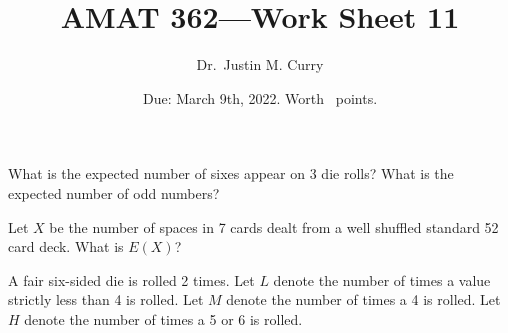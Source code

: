 \documentclass[addpoints,12pt]{exam}
\title{\vspace{-1in} AMAT 362---Work Sheet 11}
\date{Due: March 9th, 2022. Worth \numpoints\ points.}
\author{Dr.~Justin M. Curry}
\begin{document}
\maketitle


\begin{questions}

\question[1] What is the expected number of sixes appear on 3 die rolls? What is the expected number of odd numbers?

\vspace{.7in}

\question[1] Let $X$ be the number of spaces in 7 cards dealt from a well shuffled standard 52 card deck. What is $E(X)$?

\vspace{1in}

\question[6] A fair six-sided die is rolled 2 times. Let $L$ denote the number of times a value strictly less than 4 is rolled. Let $M$ denote the number of times a 4 is rolled. Let $H$ denote the number of times a 5 or 6 is rolled.

\noaddpoints
{}
\addpoints


\end{questions}
\end{document}
